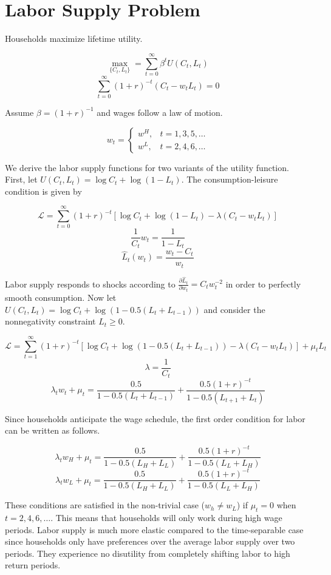 \documentclass[11pt]{article}
\begin{document}
\section{Labor Supply Problem}

    Households maximize lifetime utility.

        $$ \max_{\{C_t, L_t\}} = \sum_{t=0}^\infty \beta^t U(C_t, L_t) $$
        $$ \sum_{t=0}^\infty (1+r)^{-t} (C_t - w_t L_t) = 0 $$

    Assume $\beta = (1+r)^{-1}$ and wages follow a law of motion.

        $$ w_t = \begin{cases}
        w^H, & t = 1, 3, 5, \dots \\
        w^L, & t = 2, 4, 6, \dots
        \end{cases} $$

    We derive the labor supply functions for two variants of the utility function. First, let $U(C_t, L_t) = \log C_t + \log(1-L_t)$. The consumption-leisure condition is given by

        $$ \mathcal L = \sum_{t=0}^\infty (1+r)^{-t} [\log C_t + \log(1-L_t) - \lambda (C_t - w_t L_t)] $$
        $$ \frac{1}{C_t} w_t =  \frac{1}{1-L_t} $$
        $$ \hat L_t(w_t) = \frac{w_t - C_t}{w_t} $$

    Labor supply responds to shocks according to $\frac{\partial \hat L_t}{\partial w_t} = C_t w_t^{-2}$ in order to perfectly smooth consumption. Now let $U(C_t, L_t) = \log C_t + \log(1- 0.5 (L_t + L_{t-1}))$ and consider the nonnegativity constraint $L_t \geq 0$.

        $$ \mathcal L = \sum_{t=1}^\infty (1+r)^{-t} [\log C_t + \log(1- 0.5 (L_t + L_{t-1})) - \lambda (C_t - w_t L_t)] + \mu_t L_t $$
        $$ \lambda = \frac{1}{C_t} $$
        $$ \lambda_t w_t + \mu_t = \frac{0.5}{1-0.5(L_t + L_{t-1})} + \frac{0.5 (1+r)^{-t}}{1-0.5(L_{t+1} + L_t)} $$

    Since households anticipate the wage schedule, the first order condition for labor can be written as follows.

        $$ \lambda_t w_H + \mu_t = \frac{0.5}{1-0.5(L_H + L_L)} + \frac{0.5 (1+r)^{-t}}{1-0.5(L_L + L_H)} $$
        $$ \lambda_t w_L + \mu_t = \frac{0.5}{1-0.5(L_H + L_L)} + \frac{0.5 (1+r)^{-t}}{1-0.5(L_L + L_H)} $$

    These conditions are satisfied in the non-trivial case ($w_h \neq w_L$) if $\mu_t = 0$ when $t = 2, 4, 6, \dots$. This means that households will only work during high wage periods. Labor supply is much more elastic compared to the time-separable case since households only have preferences over the average labor supply over two periods. They experience no disutility from completely shifting labor to high return periods.
\end{document}
